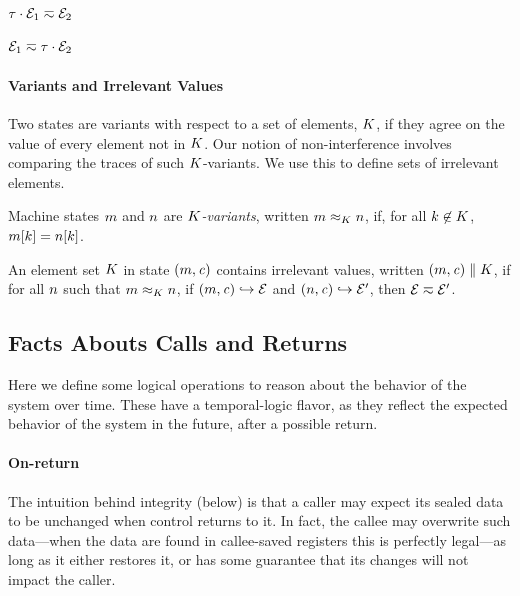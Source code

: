 \documentclass[10pt,conference]{ieeetran}%
\theoremstyle{definition}
\begin{document}
\begin{minipage}{.4\columnwidth}
           {\(\tau \cdot \mathcal{E}_1 \eqsim \mathcal{E}_2\)}
\end{minipage}
\begin{minipage}{.4\columnwidth}
           {\(\mathcal{E}_1 \eqsim \tau \cdot \mathcal{E}_2\)}
\end{minipage}

\paragraph*{Variants and Irrelevant Values}

Two states are variants with respect to a set of elements, \(K\),
if they agree on the value of every element not in \(K\). Our
notion of non-interference involves comparing the traces of such
\(K\)-variants. We use this to define sets of irrelevant elements.

 Machine states \(m\) and \(n\) are {\em \(K\)-variants},
written \(m \approx_K n\), if, for
all \(k \not \in K\), \(m[k] = n[k]\).

 An element set \(K\) in state \((m,\mathit{c})\) contains
irrelevant values, written \((m,\mathit{c}) \parallel K\), if for all
\(n\) such that \(m \approx_{K} n\), if 
\((m,\mathit{c}) \hookrightarrow \mathcal{E}\) and
\((n,\mathit{c}) \hookrightarrow \mathcal{E}'\), then
\(\mathcal{E} \eqsim \mathcal{E}'\).

\subsection{Facts Abouts Calls and Returns}
\label{sec:facts}

Here we define some logical operations to reason about the behavior of the
system over time. These have a temporal-logic flavor, as they reflect
the expected behavior of the system in the future, after a possible return.

\paragraph*{On-return}

The intuition behind integrity (below) is that a caller may expect its
sealed data to be unchanged when control returns to it. In fact, the callee
may overwrite such data---when the data are found in callee-saved registers
this is perfectly legal---as long as it either restores it, or has some guarantee
that its changes will not impact the caller.
\end{document}
